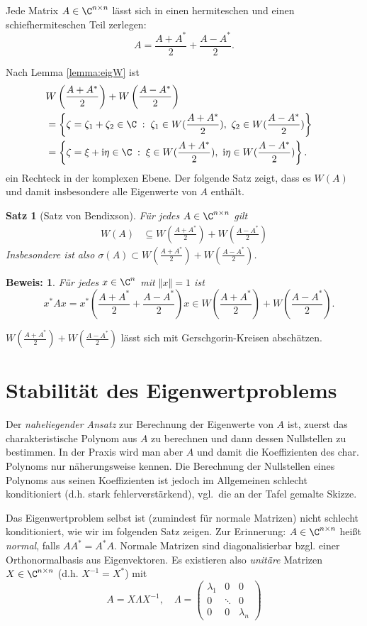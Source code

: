 \documentclass[
]{mycourse}
\theoremstyle{mythm}
\newtheorem{theorem}{Satz}[chapter]
\theoremstyle{break}
\newtheorem*{beweis}{Beweis:}
\newcommand{\norm}[1]{\left\Vert#1\right\Vert}		%
\renewcommand{\im}{\ensuremath{\mathrm{i}}} 			      	%
\newcommand{\dd}{\; : \;}    			      	%
\begin{document}
Jede Matrix $A\in \C^{n\times n}$ lässt sich in einen hermiteschen und einen schiefhermiteschen Teil zerlegen:
\[
A=\frac{A+A^*}{2}+\frac{A-A^*}{2}.
\]

Nach Lemma \ref{lemma:eigW} ist
\begin{align*}
\lefteqn{W \left(\frac{A+A^*}{2}\right)+W\left(\frac{A-A^*}{2}\right)}\\
&=\left\{ \zeta=\zeta_1+\zeta_2\in \C \dd \zeta_1\in W(\frac{A+A^*}{2}),\ \zeta_2\in W(\frac{A-A^*}{2}) \right\}\\
&=\left\{ \zeta=\xi + \im \eta\in \C \dd \xi \in W(\frac{A+A^*}{2}),\ \im \eta \in W(\frac{A-A^*}{2}) \right\}.\\
\end{align*}
ein Rechteck in der komplexen Ebene. Der folgende Satz zeigt, dass es $W(A)$ und damit insbesondere alle Eigenwerte von $A$ enthält.

\begin{theorem}[Satz von Bendixson]
Für jedes $A\in \C^{n\times n}$ gilt
\begin{align*}
W(A)& \subseteq W(\frac{A+A^*}{2})+W(\frac{A-A^*}{2})
\end{align*}
Insbesondere ist also $\sigma(A)\subset  W(\frac{A+A^*}{2})+W(\frac{A-A^*}{2})$.
\end{theorem}
\begin{beweis}
Für jedes $x\in \C^n$ mit $\norm{x}=1$ ist
\[
\quad x^* A x=x^* \left( \frac{A+A^*}{2}+\frac{A-A^*}{2}\right) x\in W(\frac{A+A^*}{2})+W(\frac{A-A^*}{2}).
\]
\end{beweis}

$W(\frac{A+A^*}{2})+W(\frac{A-A^*}{2})$ lässt sich mit Gerschgorin-Kreisen abschätzen.




\section{Stabilität des Eigenwertproblems}

Der \emph{naheliegender Ansatz} zur Berechnung der Eigenwerte von $A$ ist, zuerst das charakteristische Polynom aus $A$ zu berechnen und dann dessen Nullstellen zu bestimmen. In der Praxis wird man aber $A$ und damit die Koeffizienten des char. Polynoms nur näherungsweise kennen. Die Berechnung der Nullstellen eines Polynoms aus seinen Koeffizienten ist jedoch im Allgemeinen schlecht konditioniert (d.h. stark fehlerverstärkend), vgl.\ die an der Tafel gemalte Skizze.

Das Eigenwertproblem selbst ist (zumindest für normale Matrizen) nicht schlecht konditioniert, wie wir im folgenden Satz zeigen.
Zur Erinnerung: $A\in \C^{n\times n}$ heißt \emph{normal}, falls $AA^*=A^*A$. Normale Matrizen sind diagonalisierbar bzgl. einer Orthonormalbasis
aus Eigenvektoren. Es existieren also \emph{unitäre} Matrizen $X\in \C^{n\times n}$ (d.h. $X^{-1}=X^*$) mit 
\[
A=X \Lambda X^{-1}, \quad \Lambda=\begin{pmatrix} \lambda_1 & 0 & 0\\ 0 & \ddots & 0\\ 0 & 0 & \lambda_n\end{pmatrix}
\]
\end{document}
